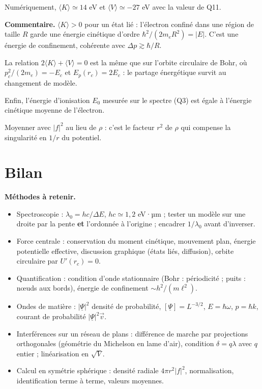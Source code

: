 \documentclass[11pt,a4paper]{article}
\providecommand{\tightlist}{\setlength{\itemsep}{0pt}\setlength{\parskip}{0pt}}
\newcommand{\equationajustee}[1]{%
  \sbox{\boiteequation}{$\displaystyle #1$}%
  \ifdim\wd\boiteequation>\linewidth
    \[\resizebox{\linewidth}{!}{\usebox{\boiteequation}}\]%
  \else
    \[#1\]%
  \fi}
\begin{document}
\equationajustee{\boxed{\langle K\rangle=E_0}}

Numériquement, \(\langle K\rangle\simeq14\) eV et \(\langle V\rangle\simeq-27\) eV avec la valeur de Q11.

\textbf{Commentaire.} \(\langle K\rangle>0\) pour un état lié : l'électron confiné dans une région de taille \(R\) garde une énergie cinétique d'ordre \(\hbar^2/(2m_eR^2)=|E|\). C'est une énergie de confinement, cohérente avec \(\Delta p\gtrsim\hbar/R\).

La relation \(2\langle K\rangle+\langle V\rangle=0\) est la même que sur l'orbite circulaire de Bohr, où \(p_c^2/(2m_e)=-E_c\) et \(E_p(r_c)=2E_c\) : le partage énergétique survit au changement de modèle.

Enfin, l'énergie d'ionisation \(E_0\) mesurée sur le spectre (Q3) est égale à l'énergie cinétique moyenne de l'électron.

\begin{piege}

Moyenner avec \(|f|^2\) au lieu de \(\rho\) : c'est le facteur \(r^2\) de \(\rho\) qui compense la singularité en \(1/r\) du potentiel.

\end{piege}

\hypertarget{bilan}{%
\section{Bilan}\label{bilan}}

\textbf{Méthodes à retenir.}

\begin{itemize}
\tightlist
\item
  Spectroscopie : \(\lambda_0=hc/\Delta E\), \(hc\simeq1{,}2\) eV·µm ; tester un modèle sur une droite par la pente \textbf{et} l'ordonnée à l'origine ; encadrer \(1/\lambda_0\) avant d'inverser.
\item
  Force centrale : conservation du moment cinétique, mouvement plan, énergie potentielle effective, discussion graphique (états liés, diffusion), orbite circulaire par \(U'(r_c)=0\).
\item
  Quantification : condition d'onde stationnaire (Bohr : périodicité ; puits : nœuds aux bords), énergie de confinement \(\sim h^2/(m\ell^2)\).
\item
  Ondes de matière : \(|\underline\Psi|^2\) densité de probabilité, \([\underline\Psi]=L^{-3/2}\), \(E=\hbar\omega\), \(p=\hbar k\), courant de probabilité \(|\underline\Psi|^2\vec v\).
\item
  Interférences sur un réseau de plans : différence de marche par projections orthogonales (géométrie du Michelson en lame d'air), condition \(\delta=q\lambda\) avec \(q\) entier ; linéarisation en \(\sqrt V\).
\item
  Calcul en symétrie sphérique : densité radiale \(4\pi r^2|f|^2\), normalisation, identification terme à terme, valeurs moyennes.
\end{itemize}
\end{document}
